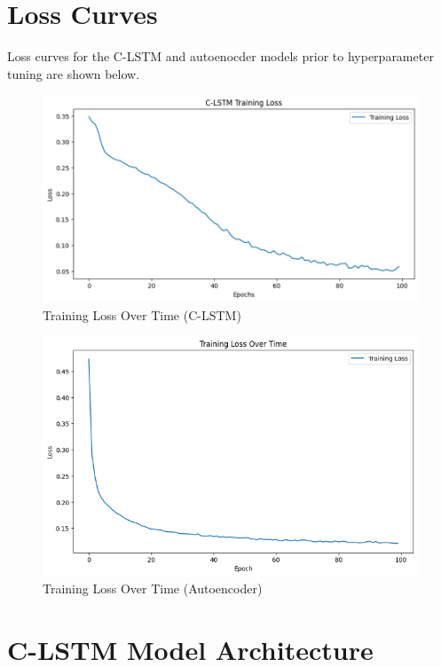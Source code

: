 \documentclass[10pt,twocolumn,letterpaper]{article}
\begin{document}
\begin{appendices}
\section{Loss Curves}
\normalsize
Loss curves for the C-LSTM and autoenocder models prior to hyperparameter tuning are shown below.
\begin{figure}[htbp]
   \centering
   \includegraphics[width=\linewidth]{images/C-LSTM_loss.png}
   \caption{Training Loss Over Time (C-LSTM)}
   \label{fig:c_lstm_training_loss}
   \end{figure}
   
   \begin{figure}[htbp]
   \centering
   \includegraphics[width=\linewidth]{images/autoenc_loss.png}
   \caption{Training Loss Over Time (Autoencoder)}
   \label{fig:autoencoder_training_loss}
   \end{figure}

\section{C-LSTM Model Architecture}


\end{appendices}
\end{document}
